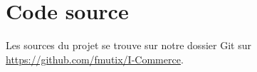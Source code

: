 \section{Code source}

Les sources du projet se trouve sur notre dossier Git sur 
\href{https://github.com/fmutix/I-Commerce}
{https://github.com/fmutix/I-Commerce}.
